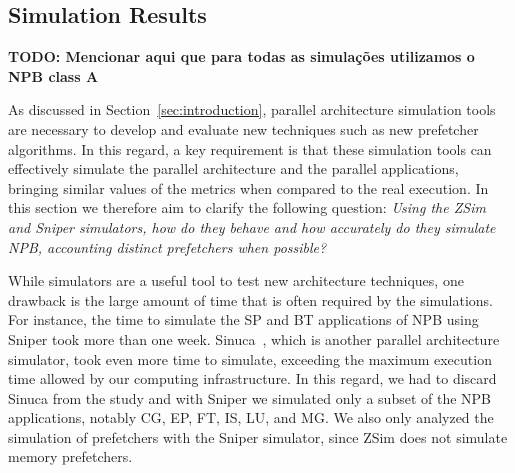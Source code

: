 \documentclass[AMA,final,STIX1COL]{WileyNJD-v2}
\begin{document}

\subsection{Simulation Results}\label{subs:simulation}

\textbf{TODO: Mencionar aqui que para todas as simulações utilizamos o NPB class A}

As discussed in Section~\ref{sec:introduction}, parallel architecture simulation tools are necessary to develop and evaluate new techniques such as new prefetcher algorithms. In this regard, a key requirement is that these simulation tools can effectively simulate the parallel architecture and the parallel applications, bringing similar values of the metrics when compared to the real execution. In this section we therefore aim to clarify the following question: \textit{Using the ZSim and Sniper simulators, how do they behave and how accurately do they simulate NPB, accounting distinct prefetchers when possible?}

While simulators are a useful tool to test new architecture techniques, one drawback is the large amount of time that is often required by the simulations. For instance, the time to simulate the SP and BT applications of NPB using Sniper took more than one week. Sinuca~\cite{alves2015sinuca}, which is another parallel architecture simulator, took even more time to simulate, exceeding the maximum execution time allowed by our computing infrastructure. In this regard, we had to discard Sinuca from the study and with Sniper we simulated only a subset of the NPB applications, notably CG, EP, FT, IS, LU, and MG. 
We also only analyzed the simulation of prefetchers with the Sniper simulator, since ZSim does not simulate memory prefetchers. 
\end{document}
